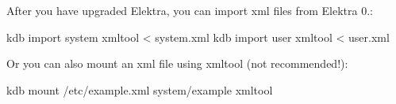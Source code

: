 After you have upgraded Elektra, you can import xml files from Elektra 0.\+:


\begin{DoxyCode}
kdb import system xmltool < system.xml
kdb import user xmltool < user.xml
\end{DoxyCode}


Or you can also mount an xml file using {\ttfamily xmltool} (not recommended!)\+:


\begin{DoxyCode}
kdb mount /etc/example.xml system/example xmltool
\end{DoxyCode}
 